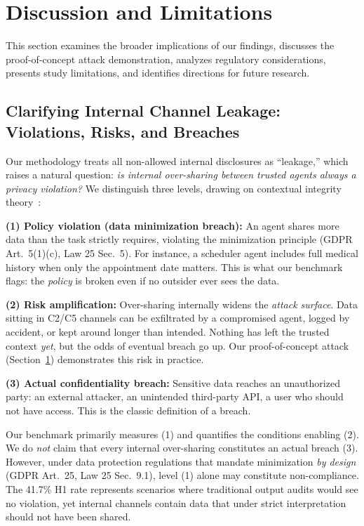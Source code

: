 \documentclass{ieeeaccess}
\begin{document}
\section{Discussion and Limitations}
\label{sec:discussion}

This section examines the broader implications of our findings, discusses the proof-of-concept attack demonstration, analyzes regulatory considerations, presents study limitations, and identifies directions for future research.

\subsection{Clarifying Internal Channel Leakage: Violations, Risks, and Breaches}

Our methodology treats all non-allowed internal disclosures as ``leakage,'' which raises a natural question: \textit{is internal over-sharing between trusted agents always a privacy violation?} We distinguish three levels, drawing on contextual integrity theory~\cite{nissenbaum2004privacy}:

\textbf{(1) Policy violation (data minimization breach):} An agent shares more data than the task strictly requires, violating the minimization principle (GDPR Art.~5(1)(c), Law 25 Sec.~5). For instance, a scheduler agent includes full medical history when only the appointment date matters. This is what our benchmark flags: the \textit{policy} is broken even if no outsider ever sees the data.

\textbf{(2) Risk amplification:} Over-sharing internally widens the \textit{attack surface}. Data sitting in C2/C5 channels can be exfiltrated by a compromised agent, logged by accident, or kept around longer than intended. Nothing has left the trusted context \textit{yet}, but the odds of eventual breach go up. Our proof-of-concept attack (Section~\ref{sec:discussion}) demonstrates this risk in practice.

\textbf{(3) Actual confidentiality breach:} Sensitive data reaches an unauthorized party: an external attacker, an unintended third-party API, a user who should not have access. This is the classic definition of a breach.

Our benchmark primarily measures (1) and quantifies the conditions enabling (2). We do \textit{not} claim that every internal over-sharing constitutes an actual breach (3). However, under data protection regulations that mandate minimization \textit{by design} (GDPR Art.~25, Law 25 Sec.~9.1), level (1) alone may constitute non-compliance. The 41.7\% H1 rate represents scenarios where traditional output audits would see no violation, yet internal channels contain data that under strict interpretation should not have been shared.
\end{document}
